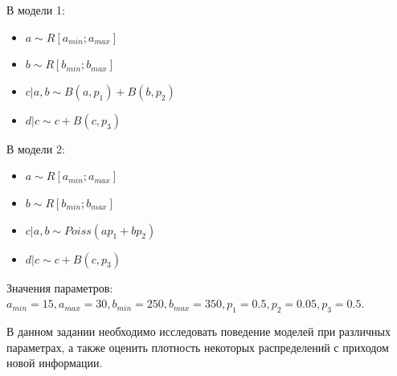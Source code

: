 \documentclass[12pt,a4paper,oneside,fleqn,leqno]{article}
\begin{document}
	\begin{minipage}{0.5\textwidth}
		\vspace{10pt}
			В модели 1:
			\begin{itemize}
				\item
				$a \sim R[a_{min}; a_{max}]$
				\item
				$b \sim R[b_{min}; b_{max}]$
				\item
				$c|a,b \sim B(a, p_1) + B(b, p_2)$
				\item
				$d|c \sim c + B(c, p_3)$
			\end{itemize}
		\end{minipage}
		\begin{minipage}{0.5\textwidth}
			В модели 2:
			\begin{itemize}
				\item
				$a \sim R[a_{min}; a_{max}]$
				\item
				$b \sim R[b_{min}; b_{max}]$
				\item
				$c|a,b \sim Poiss(ap_1 + bp_2)$
				\item
				$d|c \sim c + B(c, p_3)$
			\end{itemize}
		\end{minipage}
		\vspace{10pt}\par
		Значения параметров: $a_{min} = 15, a_{max} = 30, b_{min} = 250, b_{max} = 350, p_1 = 0.5, p_2 = 0.05, p_3 = 0.5.$\par
		В данном задании необходимо исследовать поведение моделей при различных параметрах, а также оценить плотность некоторых распределений с приходом новой информации.
\end{document}
